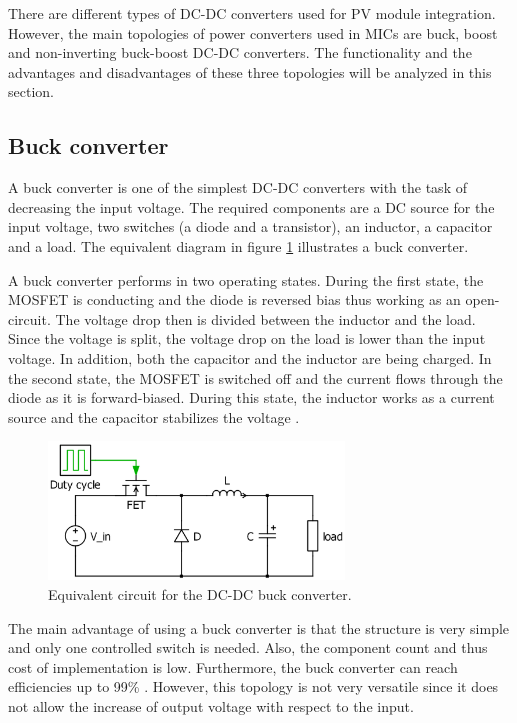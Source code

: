 There are different types of DC-DC converters used for PV module integration. However, the main topologies of power converters used in MICs are buck, boost and non-inverting buck-boost DC-DC converters. The functionality and the advantages and disadvantages of these three topologies will be analyzed in this section.

\subsection{Buck converter\label{Buck-C}}

A buck converter is one of the simplest DC-DC converters with the task of decreasing the input voltage. The required components are a DC source for the input voltage, two switches (a diode and a transistor), an inductor, a capacitor and a load. The equivalent diagram in figure \ref{Buck-converter} illustrates a buck converter. 

A buck converter performs in two operating states. 
During the first state, the MOSFET is conducting and the diode is reversed bias thus working as an open-circuit. The voltage drop  then is divided between the inductor and the load. Since the voltage is split, the voltage drop on the load is lower than the input voltage. In addition, both the capacitor and the inductor are being charged. In the second state, the MOSFET is switched off and the current flows through the diode as it is forward-biased. During this state, the inductor works as a current source and the capacitor stabilizes the voltage \cite{schematicbuckandboost}.

\begin{figure}[H]
	\begin{center}
		\includegraphics[width=0.7\textwidth]{../Pictures/Buck-converter}
		\caption{Equivalent circuit for the DC-DC buck converter.}
		\label{Buck-converter}
	\end{center}	
\end{figure}

The main advantage of using a buck converter is that the structure is very simple and only one controlled  switch is needed. Also, the component count and thus cost of implementation is low. Furthermore, the buck converter can reach efficiencies up to 99\% \cite{Efficiencybuck}. However, this topology is not very versatile since it does not allow the increase of output voltage with respect to the input.

